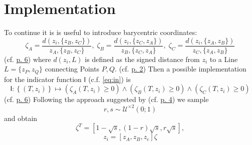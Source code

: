 \section{Implementation}
To continue it is is useful to introduce barycentric coordinates:
$$\zeta_A = \frac{d(z_i, \{z_B, z_C\})} {z_A, \{z_B, z_C\}}, \; 
\zeta_B = \frac{d(z_i, \{z_C, z_A\})} {z_B, \{z_C, z_A\}}, \;
\zeta_C = \frac{d(z_i, \{z_A, z_B\})} {z_C, \{z_A, z_B\}}$$
(cf.  \href{Burkardt-ComputationalGeometryLab-02-BarycentricCoordinatesinTriangles.pdf}{p. 6})
where $d(z_i, L)$ is defined as the signed distance from $z_i$ to a Line $L = \{z_P, z_Q\}$ connecting Points $P, Q$.
(cf.  \href{Burkardt-ComputationalGeometryLab-02-BarycentricCoordinatesinTriangles.pdf}{p. 2})
Then a possible implementation for the indicator function $\mathsf{I}$ (c.f. \ref{eq:in}) is
$$\mathsf{I}: \left\{(T, z_i)\right\} \mapsto (\zeta_A(T, z_i) \geq 0) \land (\zeta_B(T, z_i) \geq 0) \land (\zeta_C(T, z_i) \geq 0)$$
(cf.  \href{Burkardt-ComputationalGeometryLab-02-BarycentricCoordinatesinTriangles.pdf}{p. 6})
Following the approach suggested by 
(cf.  \href{Burkardt-ComputationalGeometryLab-03-MonteCarloOnTriangles.pdf}{p. 4})
we sample 
$$r, s \sim \mathcal{U}^{\times 2}(0; 1)$$
and obtain
$$\zeta^T = [1 - \sqrt{s}, (1 - r) \sqrt{s}, r \sqrt{s}], $$
$$z_i = [z_A, z_B, z_c] \zeta$$


